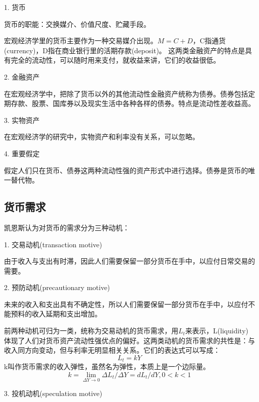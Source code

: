 \documentclass{article}
\begin{document}
1. 货币

货币的职能：交换媒介、价值尺度、贮藏手段。

宏观经济学里的货币主要作为一种交易媒介出现。$ M=C+D$，C指通货(currency)，D指在商业银行里的活期存款(deposit)。
这两类金融资产的特点是具有完全的流动性，可以随时用来支付，就收益来讲，它们的收益很低。

\hspace*{\fill}

2. 金融资产

在宏观经济学中，把除了货币以外的其他流动性金融资产统称为债券。债券包括定期存款、股票、国库券以及现实生活中各种各样的债券。特点是流动性差收益高。

\hspace*{\fill}

3. 实物资产

在宏观经济学的研究中，实物资产和利率没有关系，可以忽略。

\hspace*{\fill}

4. 重要假定

假定人们只在货币、债券这两种流动性强的资产形式中进行选择。债券是货币的唯一替代物。

\subsection{货币需求}
凯恩斯认为对货币的需求分为三种动机：

\hspace*{\fill}

1. 交易动机(transaction motive)

由于收入与支出有时滞，因此人们需要保留一部分货币在手中，以应付日常交易的需要。

\hspace{\fill}

2. 预防动机(precautionary motive)

未来的收入和支出具有不确定性，所以人们需要保留一部分货币在手中，以应付不能预料的收入延期和支出增加。

\hspace*{\fill}

前两种动机可归为一类，统称为交易动机的货币需求，用$ L_t $来表示，L(liquidity)体现了人们对货币资产流动性强优点的偏好。这两类动机的货币需求的共性是：与收入同方向变动，但与利率无明显相关关系。它们的表达式可以写成：
\[
L_t=kY
\]
k叫作货币需求的收入弹性，虽然名为弹性，本质上是一个边际量。
\[
k=\lim_{\Delta Y\rightarrow 0}\Delta L_t/\Delta Y=dL_t/dY,0<k<1
\]

3. 投机动机(speculation motive)
\end{document}
